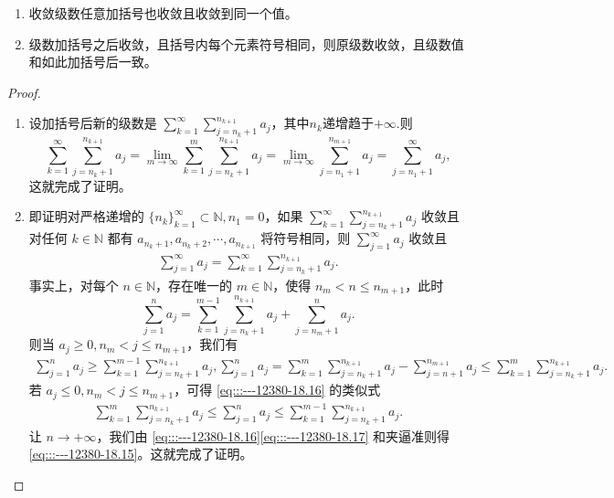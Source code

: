 \documentclass[../../main.tex]{subfiles}%
\begin{document}
\begin{theorem}[级数加括号的理解]\label{theorem:级数加括号的理解}
\begin{enumerate}
\item 收敛级数任意加括号也收敛且收敛到同一个值。

\item 级数加括号之后收敛，且括号内每个元素符号相同，则原级数收敛，且级数值和如此加括号后一致。
\end{enumerate}
\end{theorem}
\begin{proof}
\begin{enumerate}
\item 设加括号后新的级数是 \( \sum_{k = 1}^{\infty} \sum_{j = n_k + 1}^{n_{k + 1}} a_j \)，其中$n_k$递增趋于$+\infty.$则
\[
\sum_{k = 1}^{\infty} \sum_{j = n_k + 1}^{n_{k + 1}} a_j = \lim_{m \to \infty} \sum_{k = 1}^{m} \sum_{j = n_k + 1}^{n_{k + 1}} a_j = \lim_{m \to \infty} \sum_{j = n_1 + 1}^{n_{m + 1}} a_j = \sum_{j = n_1 + 1}^{\infty} a_j,
\]
这就完成了证明。

\item 即证明对严格递增的 \( \{n_k\}_{k = 1}^{\infty} \subset \mathbb{N}, n_1 = 0 \)，如果 \( \sum_{k = 1}^{\infty} \sum_{j = n_k + 1}^{n_{k + 1}} a_j \) 收敛且对任何 \( k \in \mathbb{N} \) 都有 \( a_{n_k + 1}, a_{n_k + 2}, \cdots, a_{n_{k + 1}} \) 将符号相同，则 \( \sum_{j = 1}^{\infty} a_j \) 收敛且
\begin{align}
\sum_{j = 1}^{\infty} a_j = \sum_{k = 1}^{\infty} \sum_{j = n_k + 1}^{n_{k + 1}} a_j. \label{eq:::---12380-18.15}
\end{align}
事实上，对每个 \( n \in \mathbb{N} \)，存在唯一的 \( m \in \mathbb{N} \)，使得 \( n_m < n \leqslant n_{m + 1} \)，此时
\[
\sum_{j = 1}^{n} a_j = \sum_{k = 1}^{m - 1} \sum_{j = n_k + 1}^{n_{k + 1}} a_j + \sum_{j = n_m + 1}^{n} a_j.
\]
则当 \( a_j \geqslant 0, n_m < j \leqslant n_{m + 1} \)，我们有
\begin{align}
\sum_{j = 1}^{n} a_j \geqslant \sum_{k = 1}^{m - 1} \sum_{j = n_k + 1}^{n_{k + 1}} a_j, \sum_{j = 1}^{n} a_j = \sum_{k = 1}^{m} \sum_{j = n_k + 1}^{n_{k + 1}} a_j - \sum_{j = n + 1}^{n_{m + 1}} a_j \leqslant \sum_{k = 1}^{m} \sum_{j = n_k + 1}^{n_{k + 1}} a_j. \label{eq:::---12380-18.16}
\end{align}
若 \( a_j \leqslant 0, n_m < j \leqslant n_{m + 1} \)，可得 \eqref{eq:::---12380-18.16} 的类似式
\begin{align}
\sum_{k = 1}^{m} \sum_{j = n_k + 1}^{n_{k + 1}} a_j \leqslant \sum_{j = 1}^{n} a_j \leqslant \sum_{k = 1}^{m - 1} \sum_{j = n_k + 1}^{n_{k + 1}} a_j. \label{eq:::---12380-18.17}
\end{align}
让 \( n \to +\infty \)，我们由 \eqref{eq:::---12380-18.16}\eqref{eq:::---12380-18.17} 和夹逼准则得 \eqref{eq:::---12380-18.15}。这就完成了证明。
\end{enumerate}
\end{proof}
\end{document}
